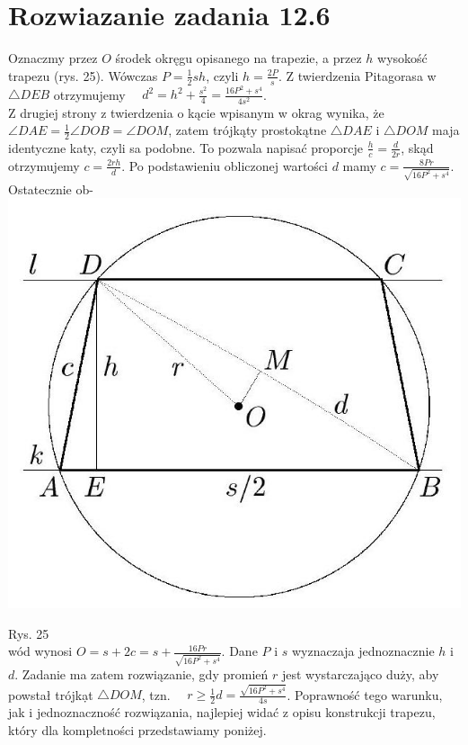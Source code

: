 \documentclass[10pt]{article}
\begin{document}
\section*{Rozwiazanie zadania 12.6}
Oznaczmy przez $O$ środek okręgu opisanego na trapezie, a przez $h$ wysokość trapezu (rys. 25). Wówczas $P=\frac{1}{2} s h$, czyli $h=\frac{2 P}{s}$. Z twierdzenia Pitagorasa w $\triangle D E B$ otrzymujemy $\quad d^{2}=h^{2}+\frac{s^{2}}{4}=\frac{16 P^{2}+s^{4}}{4 s^{2}}$.\\
Z drugiej strony z twierdzenia o kącie wpisanym w okrag wynika, że $\angle D A E=\frac{1}{2} \angle D O B=\angle D O M$, zatem trójkąty prostokątne $\triangle D A E$ i $\triangle D O M$ maja identyczne katy, czyli sa podobne. To pozwala napisać proporcje $\frac{h}{c}=\frac{d}{2 r}$, skąd otrzymujemy $c=\frac{2 r h}{d}$. Po podstawieniu obliczonej wartości $d$ mamy $c=\frac{8 P r}{\sqrt{16 P^{2}+s^{4}}}$. Ostatecznie ob-\\
\includegraphics[max width=\textwidth, center]{2024_11_16_fe5b564401bf7db98894g-120}

Rys. 25\\
wód wynosi $O=s+2 c=s+\frac{16 P r}{\sqrt{16 P^{2}+s^{4}}}$. Dane $P$ i $s$ wyznaczaja jednoznacznie $h$ i $d$. Zadanie ma zatem rozwiązanie, gdy promień $r$ jest wystarczająco duży, aby powstał trójkạt $\triangle D O M$, tzn. $\quad r \geq \frac{1}{2} d=\frac{\sqrt{16 P^{2}+s^{4}}}{4 s}$. Poprawność tego warunku, jak i jednoznaczność rozwiązania, najlepiej widać z opisu konstrukcji trapezu, który dla kompletności przedstawiamy poniżej.
\end{document}
